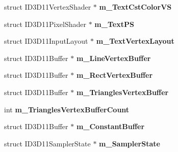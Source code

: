 \begin{DoxyCompactItemize}
\item 
\hypertarget{class_c_tw_graph_direct3_d11_ae5534c7f9abe06667e92ce366f2e918c}{struct I\+D3\+D11\+Vertex\+Shader $\ast$ {\bfseries m\+\_\+\+Text\+Cst\+Color\+V\+S}}\label{class_c_tw_graph_direct3_d11_ae5534c7f9abe06667e92ce366f2e918c}

\item 
\hypertarget{class_c_tw_graph_direct3_d11_a473fcc37c3adc203aa3abf6bcbcb256f}{struct I\+D3\+D11\+Pixel\+Shader $\ast$ {\bfseries m\+\_\+\+Text\+P\+S}}\label{class_c_tw_graph_direct3_d11_a473fcc37c3adc203aa3abf6bcbcb256f}

\item 
\hypertarget{class_c_tw_graph_direct3_d11_a779b577d695de2cef77dfe5d2a276ae9}{struct I\+D3\+D11\+Input\+Layout $\ast$ {\bfseries m\+\_\+\+Text\+Vertex\+Layout}}\label{class_c_tw_graph_direct3_d11_a779b577d695de2cef77dfe5d2a276ae9}

\item 
\hypertarget{class_c_tw_graph_direct3_d11_a02cba5287e4504699f8a871f92996eb9}{struct I\+D3\+D11\+Buffer $\ast$ {\bfseries m\+\_\+\+Line\+Vertex\+Buffer}}\label{class_c_tw_graph_direct3_d11_a02cba5287e4504699f8a871f92996eb9}

\item 
\hypertarget{class_c_tw_graph_direct3_d11_ab0515e2d236edd9a635e4e16a166d2a5}{struct I\+D3\+D11\+Buffer $\ast$ {\bfseries m\+\_\+\+Rect\+Vertex\+Buffer}}\label{class_c_tw_graph_direct3_d11_ab0515e2d236edd9a635e4e16a166d2a5}

\item 
\hypertarget{class_c_tw_graph_direct3_d11_a86cb3d3d5e238e37ced9fcebbccf2f94}{struct I\+D3\+D11\+Buffer $\ast$ {\bfseries m\+\_\+\+Triangles\+Vertex\+Buffer}}\label{class_c_tw_graph_direct3_d11_a86cb3d3d5e238e37ced9fcebbccf2f94}

\item 
\hypertarget{class_c_tw_graph_direct3_d11_a836d49937c0b7091d5f98a5c8672a17d}{int {\bfseries m\+\_\+\+Triangles\+Vertex\+Buffer\+Count}}\label{class_c_tw_graph_direct3_d11_a836d49937c0b7091d5f98a5c8672a17d}

\item 
\hypertarget{class_c_tw_graph_direct3_d11_a8e57db7f3809c5720addeb65eac94a0e}{struct I\+D3\+D11\+Buffer $\ast$ {\bfseries m\+\_\+\+Constant\+Buffer}}\label{class_c_tw_graph_direct3_d11_a8e57db7f3809c5720addeb65eac94a0e}

\item 
\hypertarget{class_c_tw_graph_direct3_d11_acc3fa9c4956bc07818375a7f6bb22559}{struct I\+D3\+D11\+Sampler\+State $\ast$ {\bfseries m\+\_\+\+Sampler\+State}}\label{class_c_tw_graph_direct3_d11_acc3fa9c4956bc07818375a7f6bb22559}

\end{DoxyCompactItemize}
